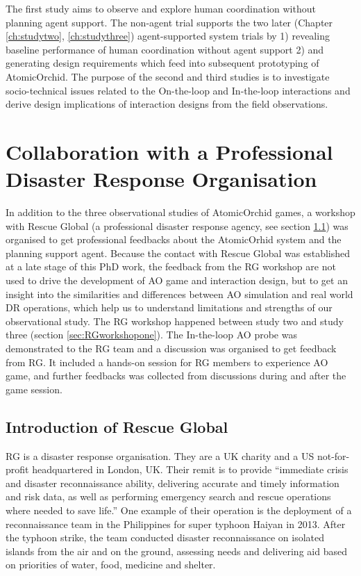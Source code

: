 The first study aims to observe and explore human coordination without planning agent support. The non-agent trial supports the two later (Chapter \ref{ch:studytwo}, \ref{ch:studythree}) agent-supported system trials by 1) revealing baseline performance of human coordination without agent support 2) and generating design requirements which feed into subsequent prototyping of AtomicOrchid. The purpose of the second and third studies is to investigate socio-technical issues related to the On-the-loop and In-the-loop interactions and derive design implications of interaction designs from the field observations.\\

\section{Collaboration with a Professional Disaster Response Organisation}
In addition to the three observational studies of AtomicOrchid games, a workshop with Rescue Global (a professional disaster response agency, see section \ref{sec:rg}) was organised to get professional feedbacks about the AtomicOrhid system and the planning support agent. Because the contact with Rescue Global was established at a late stage of this PhD work, the feedback from the \ac{RG} workshop are not used to drive the development of \ac{AO} game and interaction design, but to get an insight into the similarities and differences between \ac{AO} simulation and real world \ac{DR} operations, which help us to understand limitations and strengths of our observational study.  The \ac{RG} workshop happened between study two and study three (section \ref{sec:RGworkshopone}). The In-the-loop \ac{AO} probe was demonstrated to the \ac{RG} team and a discussion was organised to get feedback from \ac{RG}. It included a hands-on session for \ac{RG} members to experience \ac{AO} game, and further feedbacks was collected from discussions during and after the game session.\\

\subsection{Introduction of Rescue Global}\label{sec:rg}
\acf{RG} is a disaster response organisation. They are a UK charity and a US not-for-profit headquartered in London, UK. Their remit is to provide ``immediate crisis and disaster reconnaissance ability, delivering accurate and timely information and risk data, as well as performing emergency search and rescue operations where needed to save life.'' One example of their operation is the deployment of a reconnaissance team in the Philippines for super typhoon Haiyan in 2013. After the typhoon strike, the team conducted disaster reconnaissance on isolated islands from the air and on the ground, assessing needs and delivering aid based on priorities of water, food, medicine and shelter.\\

